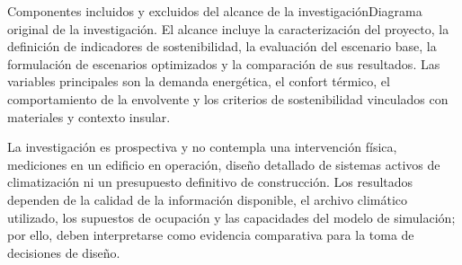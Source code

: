 \begin{landscape}
\begin{pilotoTextoGrafico}{\graficoAlcanceIntro}{Componentes incluidos y excluidos del alcance de la investigación}{Diagrama original de la investigación.}
El alcance incluye la caracterización del proyecto, la definición de indicadores de sostenibilidad, la evaluación del escenario base, la formulación de escenarios optimizados y la comparación de sus resultados. Las variables principales son la demanda energética, el confort térmico, el comportamiento de la envolvente y los criterios de sostenibilidad vinculados con materiales y contexto insular.

La investigación es prospectiva y no contempla una intervención física, mediciones en un edificio en operación, diseño detallado de sistemas activos de climatización ni un presupuesto definitivo de construcción. Los resultados dependen de la calidad de la información disponible, el archivo climático utilizado, los supuestos de ocupación y las capacidades del modelo de simulación; por ello, deben interpretarse como evidencia comparativa para la toma de decisiones de diseño.
\end{pilotoTextoGrafico}

\clearpage
\end{landscape}
\hypersetup{citecolor=introBlue,linkcolor=udaBlue,urlcolor=introBlue}
\pagestyle{fancy}

